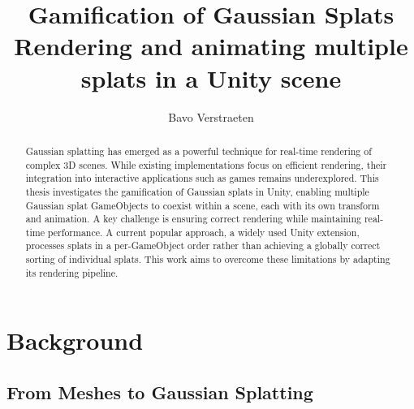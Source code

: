 \documentclass[12pt]{article}
\begin{document}
\begin{titlepage}
	\centering
	
	\title{Gamification of Gaussian Splats \\ {\large Rendering and animating multiple splats in a Unity scene}}
	
	\author{Bavo Verstraeten}
	
	
	
	\maketitle
\end{titlepage}
	
\begin{abstract}
Gaussian splatting has emerged as a powerful technique for real-time rendering of complex 3D scenes. While existing implementations focus on efficient rendering, their integration into interactive applications such as games remains underexplored. This thesis investigates the gamification of Gaussian splats in Unity, enabling multiple Gaussian splat GameObjects to coexist within a scene, each with its own transform and animation. A key challenge is ensuring correct rendering while maintaining real-time performance. A current popular approach, a widely used Unity extension, processes splats in a per-GameObject order rather than achieving a globally correct sorting of individual splats. This work aims to overcome these limitations by adapting its rendering pipeline.
\end{abstract}

\begin{titlepage}
\centering
\tableofcontents
\end{titlepage}
\section{Background}
\subsection{From Meshes to Gaussian Splatting}
\end{document}
